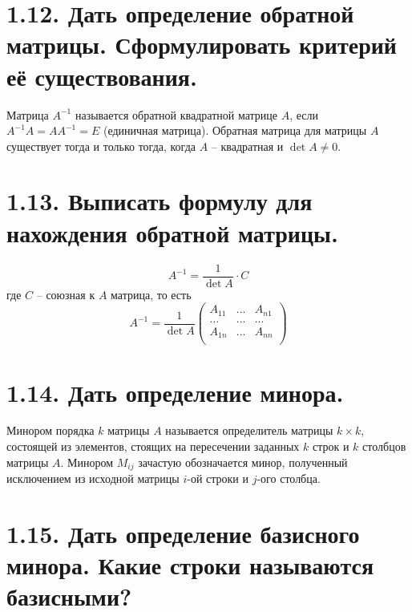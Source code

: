 \documentclass{article}
\begin{document}
\section*{\LARGE 1.12. Дать определение обратной матрицы. Сформулировать критерий её существования. }

Матрица $A^{-1}$ называется обратной квадратной матрице $A$, если $A^{-1}A = AA^{-1} = E$ (единичная матрица). Обратная матрица для матрицы $A$ существует тогда и только тогда, когда $A$ -- квадратная и $\det{A} \ne 0$.

\section*{\LARGE 1.13. Выписать формулу для нахождения обратной матрицы. }

$$
A^{-1} = \frac{1}{\det{A}}\cdot C
$$
где $C$ -- союзная к $A$ матрица, то есть 
$$
A^{-1} = \frac{1}{\det{A}}
\begin{pmatrix}
A_{11} & ... & A_{n1} \\
... & ... & ... \\
A_{1n} & ... & A_{nn} \\
\end{pmatrix}
$$

\section*{\LARGE 1.14. Дать определение минора. }

Минором порядка $k$ матрицы $A$ называется определитель матрицы $k \times k$, состоящей из элементов, стоящих на пересечении заданных $k$ строк и $k$ столбцов матрицы $A$.
\newline Минором $M_{ij}$ зачастую обозначается минор, полученный исключением из исходной матрицы $i$-ой строки и $j$-ого столбца. 

\section*{\LARGE 1.15. Дать определение базисного минора. Какие строки называются базисными?  }
\end{document}
